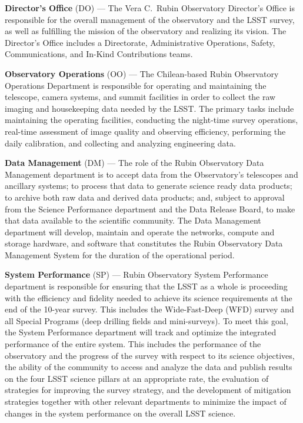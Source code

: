 \textbf{Director's Office} (DO) ---
The Vera C.\ Rubin Observatory Director's Office is responsible for the overall management of the observatory and the LSST survey, as well as fulfilling the mission of the observatory and realizing its vision.
The Director's Office includes a Directorate, Administrative Operations, Safety, Communications, and In-Kind Contributions teams.

\textbf{Observatory Operations} (OO) ---
The Chilean-based Rubin Observatory Operations Department is responsible for operating and maintaining the telescope, camera systems, and summit facilities in order to collect the raw imaging and housekeeping data needed by the LSST.
The primary tasks include maintaining the operating facilities, conducting the night-time survey operations, real-time assessment of image quality and observing efficiency, performing the daily calibration, and collecting and analyzing engineering data.

\textbf{Data Management} (DM) ---
The role of the Rubin Observatory Data Management department is to accept data from the Observatory's telescopes and ancillary systems; to process that data to generate science ready data products; to archive both raw data and derived data products; and, subject to approval from the Science Performance department and the Data Release Board, to make that data available to the scientific community.
The Data Management department will develop, maintain and operate the networks, compute and storage hardware, and software that constitutes the Rubin Observatory Data Management System for the duration of the operational period.

\textbf{System Performance} (SP) ---
Rubin Observatory System Performance department is responsible for ensuring that the LSST as a whole is proceeding with the efficiency and fidelity needed to achieve its science requirements at the end of the 10-year survey.
This includes the Wide-Fast-Deep (WFD) survey and all Special Programs (deep drilling fields and mini-surveys).
To meet this goal, the System Performance department will track and optimize the integrated performance of the entire system.
This includes the performance of the observatory and the progress of the survey with respect to its science objectives, the ability of the community to access and analyze the data and publish results on the four LSST science pillars at an appropriate rate, the evaluation of strategies for improving the survey strategy, and the development of mitigation strategies together with other relevant departments to minimize the impact of changes in the system performance on the overall LSST science.

